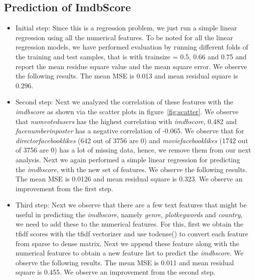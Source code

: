 \documentclass{article}%
\begin{document}
\subsection{Prediction of ImdbScore}
\begin{itemize}
\item Initial step: Since this is a regression problem, we just run a simple linear regression using all the numerical features. To be noted for all the linear regression models, we have performed evaluation by running different folds of the training and test samples, that is with trainsize = 0.5, 0.66 and 0.75 and report the mean residue square value and the mean square error. We observe the following results. The mean MSE is 0.013 and mean residual square is $0.296$.
\end{itemize}

\begin{itemize}
\item Second step: Next we analyzed the correlation of these features with the \textit{imdbscore} as shown via the scatter plots in figure~\ref{fig:scatter}. We observe that \textit{numvotedusers} has the highest correlation with \textit{imdbscore}, 0.482 and \textit{facenumberinposter} has a negative correlation of -0.065. We observe that for \textit{directorfacebooklikes} (642 out of 3756 are 0) and \textit{moviefacebooklikes} (1742 out of 3756 are 0) has a lot of missing data, hence, we remove them from our next analysis. Next we again performed a simple linear regression for predicting the \textit{imdbscore}, with the new set of features. We observe the following results. The mean MSE is 0.0126 and mean residual square is 0.323. We observe an improvement from the first step.
\end{itemize}

\begin{itemize}
\item Third step: Next we observe that there are a few text features that might be useful in predicting the \textit{imdbscore}, namely \textit{genre}, \textit{plotkeywords} and \textit{country}, we need to add these to the numerical features. For this, first we obtain the tfidf scores with the tfidf vectorizer and use todense() to convert each feature from sparse to dense matrix. Next we append these feature along with the numerical features to obtain a new feature list to predict the \textit{imdbscore}. We observe the following results. The mean MSE is 0.011 and mean residual square is 0.455. We observe an improvement from the second step.
\end{itemize}
\end{document}
